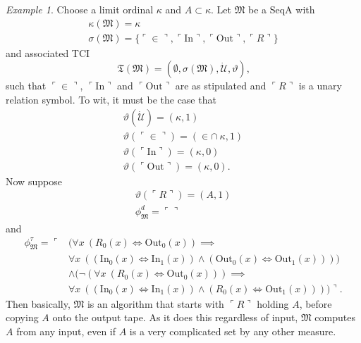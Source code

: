 \documentclass[12pt, twoside]{memoir}
\numberwithin{equation}{section}
\theoremstyle{definition}
\theoremstyle{remark}
\newtheorem{ex}[thm]{Example}
\theoremstyle{definition}
\theoremstyle{definition}
\theoremstyle{definition}
\theoremstyle{remark}
\begin{document}
\begin{ex}\label{ex217}
Choose a limit ordinal $\kappa$ and $A \subset \kappa$. Let $\mathfrak{M}$ be a SeqA with 
\begin{gather*}
    \kappa(\mathfrak{M}) = \kappa \\
    \sigma(\mathfrak{M}) = \{\ulcorner \in \urcorner, \ulcorner \mathrm{In} \urcorner, \ulcorner \mathrm{Out} \urcorner, \ulcorner R \urcorner\}
\end{gather*} 
and associated TCI 
\begin{equation*}
    \mathfrak{T}(\mathfrak{M}) = (\emptyset, \sigma(\mathfrak{M}), \dot{\mathcal{U}}, \vartheta) \text{,}
\end{equation*} 
such that $\ulcorner \in \urcorner$, $\ulcorner \mathrm{In} \urcorner$ and $\ulcorner \mathrm{Out} \urcorner$ are as stipulated and $\ulcorner R \urcorner$ is a unary relation symbol. To wit, it must be the case that
\begin{gather*}
    \vartheta(\dot{\mathcal{U}}) = (\kappa, 1) \\
    \vartheta(\ulcorner \in \urcorner) = (\in \cap \ \kappa, 1) \\
    \vartheta(\ulcorner \mathrm{In} \urcorner) = (\kappa, 0) \\
    \vartheta(\ulcorner \mathrm{Out} \urcorner) = (\kappa, 0) \text{.}
\end{gather*}
Now suppose
\begin{gather*}
    \vartheta(\ulcorner R \urcorner) = (A, 1) \\
    \phi^d_{\mathfrak{M}} = \ulcorner \urcorner
\end{gather*}
and
\begin{align*}
    \phi^{\tau}_{\mathfrak{M}} = \ulcorner & (\forall x \ (R_0(x) \iff \mathrm{Out}_0(x)) \implies \\
    & \forall x \ ((\mathrm{In}_0(x) \iff \mathrm{In}_1(x)) \wedge (\mathrm{Out}_0(x) \iff \mathrm{Out}_1(x)))) \\
    & \wedge (\neg (\forall x \ (R_0(x) \iff \mathrm{Out}_0(x))) \implies \\
    & \forall x \ ((\mathrm{In}_0(x) \iff \mathrm{In}_1(x)) \wedge (R_0(x) \iff \mathrm{Out}_1(x)))) \urcorner \text{.}
\end{align*}
Then basically, $\mathfrak{M}$ is an algorithm that starts with $\ulcorner R \urcorner$ holding $A$, before copying $A$ onto the output tape. As it does this regardless of input, $\mathfrak{M}$ computes $A$ from any input, even if $A$ is a very complicated set by any other measure.
\end{ex}
\end{document}
